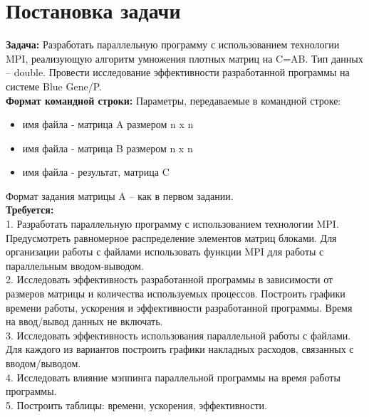 \documentclass[12pt]{article}
\begin{document}



            
        
    \section{Постановка задачи}
        \textbf{Задача:} Разработать параллельную программу с использованием технологии MPI, реализующую
        алгоритм умножения плотных матриц на C=AB. Тип данных – double. Провести
        исследование эффективности разработанной программы на системе Blue Gene/P. \\

        \textbf{Формат командной строки:} Параметры, передаваемые в командной строке:
        \begin{itemize}
            \setlength{\itemsep}{1pt}
            \setlength{\parskip}{0pt}
            \setlength{\parsep}{0pt}
            \item имя файла - матрица A размером n x n
            \item имя файла - матрица B размером n x n
            \item имя файла - результат, матрица C
        \end{itemize}
        Формат задания матрицы A – как в первом задании. \\

        \textbf{Требуется:} \\
        1. Разработать параллельную программу с использованием технологии MPI.
        Предусмотреть равномерное распределение элементов матриц блоками. Для
        организации работы с файлами использовать функции MPI для работы с
        параллельным вводом-выводом. \\
        2. Исследовать эффективность разработанной программы в зависимости от размеров
        матрицы и количества используемых процессов. Построить графики времени работы,
        ускорения и эффективности разработанной программы. Время на ввод/вывод данных
        не включать. \\
        3. Исследовать эффективность использования параллельной работы с файлами. Для
        каждого из вариантов построить графики накладных расходов, связанных с
        вводом/выводом. \\
        4. Исследовать влияние мэппинга параллельной программы на время работы
        программы. \\
        5. Построить таблицы: времени, ускорения, эффективности.
\end{document}
